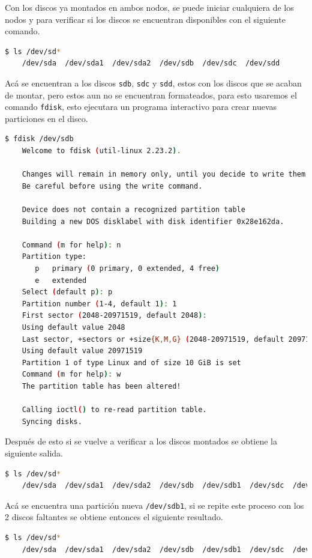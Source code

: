 \documentclass{article}
\begin{document}
Con los discos ya montados en ambos nodos, se puede iniciar cualquiera de los nodos y para verificar si los discos se encuentran disponibles con el siguiente comando.

\begin{lstlisting}[style=mystyle,language=bash]
	$ ls /dev/sd*
	/dev/sda  /dev/sda1  /dev/sda2  /dev/sdb  /dev/sdc  /dev/sdd
\end{lstlisting}

Acá se encuentran a los discos \texttt{sdb}, \texttt{sdc} y \texttt{sdd}, estos con los discos que se acaban de montar, pero estos aun no se encuentran formateados, para esto usaremos el comando \texttt{fdisk}, esto ejecutara un programa interactivo para crear nuevas particiones en el disco.

\begin{lstlisting}[style=mystyle,language=bash]
	$ fdisk /dev/sdb
	Welcome to fdisk (util-linux 2.23.2).

	Changes will remain in memory only, until you decide to write them.
	Be careful before using the write command.

	Device does not contain a recognized partition table
	Building a new DOS disklabel with disk identifier 0x28e162da.

	Command (m for help): n
	Partition type:
	   p   primary (0 primary, 0 extended, 4 free)
	   e   extended
	Select (default p): p
	Partition number (1-4, default 1): 1
	First sector (2048-20971519, default 2048):
	Using default value 2048
	Last sector, +sectors or +size{K,M,G} (2048-20971519, default 20971519):
	Using default value 20971519
	Partition 1 of type Linux and of size 10 GiB is set
	Command (m for help): w
	The partition table has been altered!

	Calling ioctl() to re-read partition table.
	Syncing disks.
\end{lstlisting}

Después de esto si se vuelve a verificar a los discos montados se obtiene la siguiente salida.

\begin{lstlisting}[style=mystyle,language=bash]
	$ ls /dev/sd*
	/dev/sda  /dev/sda1  /dev/sda2  /dev/sdb  /dev/sdb1  /dev/sdc  /dev/sdd
\end{lstlisting}

Acá se encuentra una partición nueva \texttt{/dev/sdb1}, si se repite este proceso con los 2 discos faltantes se obtiene entonces el siguiente resultado.

\begin{lstlisting}[style=mystyle,language=bash]
	$ ls /dev/sd*
	/dev/sda  /dev/sda1  /dev/sda2  /dev/sdb  /dev/sdb1  /dev/sdc  /dev/sdc1  /dev/sdd  /dev/sdd1
\end{lstlisting}
\end{document}
